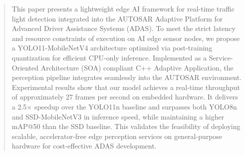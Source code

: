 \documentclass[conference]{IEEEtran}
\begin{document}

\begin{abstract}
This paper presents a lightweight edge AI framework for real-time traffic light detection integrated into the AUTOSAR Adaptive Platform for Advanced Driver Assistance Systems (ADAS). To meet the strict latency and resource constraints of execution on AI edge sensor nodes, we propose a YOLO11-MobileNetV4 architecture optimized via post-training quantization for efficient CPU-only inference. Implemented as a Service-Oriented Architecture (SOA) compliant C++ Adaptive Application, the perception pipeline integrates seamlessly into the AUTOSAR environment. Experimental results show that our model achieves a real-time throughput of approximately 27 frames per second on embedded hardware. It delivers a 2.5$\times$ speedup over the YOLO11n baseline and surpasses both YOLO8n and SSD-MobileNetV3 in inference speed, while maintaining a higher mAP@50 than the SSD baseline. This validates the feasibility of deploying scalable, accelerator-free edge perception services on general-purpose hardware for cost-effective ADAS development.
\end{abstract}
\end{document}
